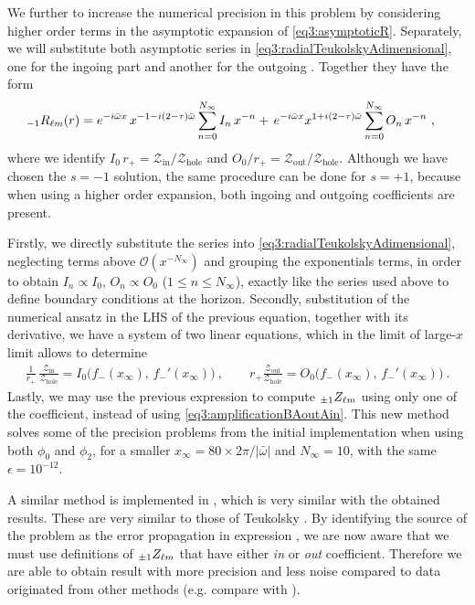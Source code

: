 We further to increase the numerical precision in this problem by considering higher order terms in the asymptotic expansion of \eqref{eq3:asymptoticR}.
Separately, we will substitute both asymptotic series in \eqref{eq3:radialTeukolskyAdimensional}, one for the ingoing part and another for the outgoing \cite{Brito2015}.
Together they have the form
\begin{align}
	\label{eq4:radialIOseries}
	\uu[-1]{R}{\ell m}(r) &= e^{-i \bar{\omega} x}  \, x^{ - 1 - i (2-\tau) \bar{\omega} } \sum_{n=0}^{N_\infty} I_n \, x^{-n} + \, e^{-i \bar{\omega} x} x^{ 1 + i (2-\tau) \bar{\omega} } \sum_{n=0}^{N_\infty} O_n \, x^{-n} ~,
\end{align}
where we identify $I_0 \,r_{+} = \mathscr{Z}_\mathrm{in}/ \mathscr{Z}_\mathrm{hole}$ and $O_0/r_{+} = \mathscr{Z}_\mathrm{out}/\mathscr{Z}_\mathrm{hole}$.
Although we have chosen the $s=-1$ solution, the same procedure can be done for $s=+1$, because when using a higher order expansion, both ingoing and outgoing coefficients are present.

Firstly, we directly substitute the series into \eqref{eq3:radialTeukolskyAdimensional}, neglecting terms above $\mathscr{O}(x^{-N_\infty})$ and grouping the exponentials terms, in order to obtain $I_n\propto I_0$, $O_n\propto O_0$ ($1 \le n \le N_\infty$), exactly like the series used above to define boundary conditions at the horizon.
Secondly, substitution of the numerical ansatz  in the LHS of the previous equation, together with its derivative, we have a system of two linear equations, which in the limit of large-$x$ limit allows to determine
\begin{align}
	\frac{1}{r_+} \,\frac{\mathscr{Z}_\mathrm{in}}{\mathscr{Z}_\mathrm{hole}} = I_0\Big( f_{-}(x_\infty), \,f_{-}{\!}'(x_\infty) \Big) ~,\qquad r_{+} \frac{\mathscr{Z}_\mathrm{out}}{\mathscr{Z}_\mathrm{hole}} = O_0\Big( f_{-}(x_\infty), \, f_{-}{\!}'(x_\infty) \Big) ~.
\end{align}
Lastly, we may use the previous expression  to compute $\uu[\pm1]{Z}{\ell m}$ using only one of the coefficient, instead of using \eqref{eq3:amplificationBAoutAin}. 
This new method solves some of the precision problems from the initial implementation when using both $\phi_0$ and $\phi_2$, for a smaller $x_\infty = 80 \times 2 \pi / |\bar{\omega}|$ and $N_\infty = 10$, with the same $\epsilon = 10^{-12}$.

A similar method is implemented in \cite{Brito2015}, which is very similar with the obtained results.
These are very similar to those of Teukolsky \cite{TeukolskyPress1973b}.
By identifying the source of the problem as the error propagation in expression , we are now aware that we must use definitions of $\uu[\pm 1]{Z}{\ell m}$ that have either \emph{in} or \emph{out} coefficient.
Therefore we are able to obtain result with more precision and less noise compared to data originated from other methods (e.g. compare with \cite{Brito2015}).

